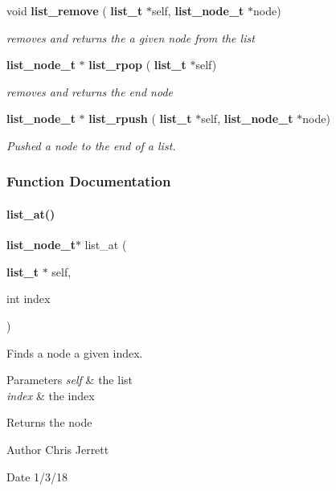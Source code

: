 \begin{DoxyCompactItemize}
void \textbf{ list\+\_\+remove} (\textbf{ list\+\_\+t} $\ast$self, \textbf{ list\+\_\+node\+\_\+t} $\ast$node)
\begin{DoxyCompactList}\small\item\em removes and returns the a given node from the list \end{DoxyCompactList}\item 
\textbf{ list\+\_\+node\+\_\+t} $\ast$ \textbf{ list\+\_\+rpop} (\textbf{ list\+\_\+t} $\ast$self)
\begin{DoxyCompactList}\small\item\em removes and returns the end node \end{DoxyCompactList}\item 
\textbf{ list\+\_\+node\+\_\+t} $\ast$ \textbf{ list\+\_\+rpush} (\textbf{ list\+\_\+t} $\ast$self, \textbf{ list\+\_\+node\+\_\+t} $\ast$node)
\begin{DoxyCompactList}\small\item\em Pushed a node to the end of a list. \end{DoxyCompactList}\end{DoxyCompactItemize}


\subsubsection{Function Documentation}
\mbox{\label{list_8c_ab3dacc64ceb63b0a0849312b0a14c91c}} 
\paragraph{list\+\_\+at()}
{\footnotesize\ttfamily \textbf{ list\+\_\+node\+\_\+t}$\ast$ list\+\_\+at (\begin{DoxyParamCaption}\item[{\textbf{ list\+\_\+t} $\ast$}]{self,  }\item[{int}]{index }\end{DoxyParamCaption})}



Finds a node a given index. 


\begin{DoxyParams}{Parameters}
{\em self} & the list \\
\hline
{\em index} & the index \\
\hline
\end{DoxyParams}
\begin{DoxyReturn}{Returns}
the node 
\end{DoxyReturn}
\begin{DoxyAuthor}{Author}
Chris Jerrett 
\end{DoxyAuthor}
\begin{DoxyDate}{Date}
1/3/18 
\end{DoxyDate}


